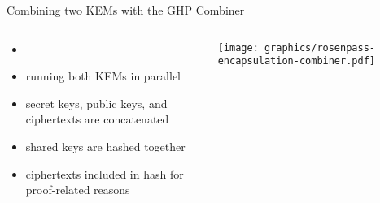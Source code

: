 




\begin{frame}{Combining two KEMs with the GHP Combiner}
  \begin{columns}[c]
    \begin{column}{.4\linewidth}
      \small
      \begin{itemize}
        \item {} \citeGhp
        \item running both KEMs in parallel
        \item secret keys, public keys, and ciphertexts are concatenated
        \item shared keys are hashed together
        \item ciphertexts included in hash for proof-related reasons
      \end{itemize}
    \end{column}
    \begin{column}{.55\linewidth}
     \texttt{[image: graphics/rosenpass-encapsulation-combiner.pdf]}
    \end{column}
  \end{columns}
\end{frame}


